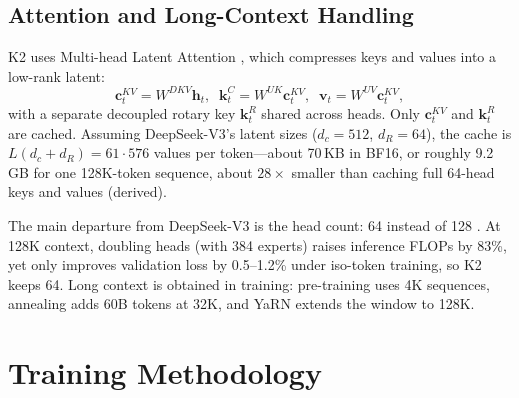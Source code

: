\documentclass[10pt,twocolumn,letterpaper]{article}
\begin{document}
\subsection{Attention and Long-Context Handling}
K2 uses Multi-head Latent Attention \cite{dsv2}, which compresses keys and values into a low-rank latent:
\begin{equation}
\mathbf{c}^{KV}_t=W^{DKV}\mathbf{h}_t,\;\;
\mathbf{k}^{C}_t=W^{UK}\mathbf{c}^{KV}_t,\;\;
\mathbf{v}_t=W^{UV}\mathbf{c}^{KV}_t,
\end{equation}
with a separate decoupled rotary key $\mathbf{k}^R_t$ shared across heads. Only $\mathbf{c}^{KV}_t$ and $\mathbf{k}^R_t$ are cached. Assuming DeepSeek-V3's latent sizes ($d_c{=}512$, $d_R{=}64$), the cache is $L(d_c{+}d_R)=61\cdot576$ values per token---about 70\,KB in BF16, or roughly 9.2\,GB for one 128K-token sequence, about $28\times$ smaller than caching full 64-head keys and values (derived).

The main departure from DeepSeek-V3 is the head count: 64 instead of 128 \cite{kimik2}. At 128K context, doubling heads (with 384 experts) raises inference FLOPs by 83\%, yet only improves validation loss by 0.5--1.2\% under iso-token training, so K2 keeps 64. Long context is obtained in training: pre-training uses 4K sequences, annealing adds 60B tokens at 32K, and YaRN \cite{yarn} extends the window to 128K.

\section{Training Methodology}
\end{document}

